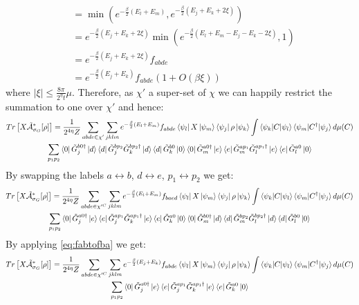 \documentclass[aps,floatfix,10pt,amssymb,amsfont,amsmath,superscriptaddress,float,nofootinbib,longbibliography,nobalancelastpage,twocolumn]{revtex4-2}
\begin{document}
\begin{widetext}
\begin{equation}
\begin{aligned}
    &= \min(e^{-\frac{\beta}{2}(E_l+E_m)}, e^{-\frac{\beta}{2}(E_j+E_k + 2\xi)})\\
    &= e^{-\frac{\beta}{2}(E_j+E_k + 2\xi)} \min(e^{-\frac{\beta}{2}(E_l+E_m-E_j-E_k-2\xi)},1)\\
    &= e^{-\frac{\beta}{2}(E_j+E_k + 2\xi)}f_{abde}\\
    &= e^{-\frac{\beta}{2}(E_j+E_k)}f_{abde}(1+O(\beta\xi))
\end{aligned}
\label{eq:fabtofba}
\end{equation}
where $|\xi| \leq \frac{8\pi}{2^{\eta}t}\mu$. Therefore, as $\chi'$ a super-set of $\chi$ we can happily restrict the summation to one over $\chi'$ and hence:
\begin{multline}
   Tr\left[X\tilde{\mathcal{A}}^*_{\sigma_G}[\rho]\right] =\frac{1}{2^{4\eta}Z} \sum_{abde\in \chi'}\sum_{jklm} e^{-\frac{\beta}{2}(E_l+E_m)}f_{abde} \bra{\psi_l}X\ket{\psi_m}\bra{\psi_j}\rho\ket{\psi_k} \int \braket{\psi_k|C|\psi_l}\braket{\psi_m|C^{\dagger}|\psi_j} d\mu(C)\\\sum_{p_1p_2} \bra{0} \tilde G^{b0\dagger}_j\ket{d}\bra{d}\tilde G^{bp_2}_j\tilde G^{bp_2\dagger}_k\ket{d}\bra{d}\tilde G^{b0}_k\ket{0}
    \bra{0}\tilde G_m^{a0\dagger}\ket{e}\bra{e}\tilde G_m^{ap_1}\tilde G_l^{ap_1\dagger}\ket{e}\bra{e}\tilde G_l^{a0}\ket{0}
\end{multline}
By swapping the labels $a \leftrightarrow b$, $d \leftrightarrow e$, $p_1 \leftrightarrow p_2$ we get:
\begin{multline}
    Tr\left[X\tilde{\mathcal{A}}^*_{\sigma_G}[\rho]\right] =\frac{1}{2^{4\eta}Z} \sum_{abde\in \chi'^C}\sum_{jklm} e^{-\frac{\beta}{2}(E_l+E_m)}f_{baed} \bra{\psi_l}X\ket{\psi_m}\bra{\psi_j}\rho\ket{\psi_k} \int \braket{\psi_k|C|\psi_l}\braket{\psi_m|C^{\dagger}|\psi_j} d\mu(C)\\\sum_{p_1p_2} \bra{0} \tilde G^{a0\dagger}_j\ket{e}\bra{e}\tilde G^{ap_1}_j\tilde G^{ap_1\dagger}_k\ket{e}\bra{e}\tilde G^{a0}_k\ket{0}
    \bra{0}\tilde G_m^{b0\dagger}\ket{d}\bra{d}\tilde G_m^{bp_2}\tilde G_l^{bp_2\dagger}\ket{d}\bra{d}\tilde G_l^{b0}\ket{0}
\end{multline}
By applying \eqref{eq:fabtofba} we get:
\begin{multline}
    Tr\left[X\tilde{\mathcal{A}}^*_{\sigma_G}[\rho]\right] =\frac{1}{2^{4\eta}Z} \sum_{abde\in \chi'^C}\sum_{jklm} e^{-\frac{\beta}{2}(E_j+E_k)}f_{abde} \bra{\psi_l}X\ket{\psi_m}\bra{\psi_j}\rho\ket{\psi_k} \int \braket{\psi_k|C|\psi_l}\braket{\psi_m|C^{\dagger}|\psi_j} d\mu(C)\\\sum_{p_1p_2} \bra{0} \tilde G^{a0\dagger}_j\ket{e}\bra{e}\tilde G^{ap_1}_j\tilde G^{ap_1\dagger}_k\ket{e}\bra{e}\tilde G^{a0}_k\ket{0}

\end{multline}
\end{widetext}
\end{document}

